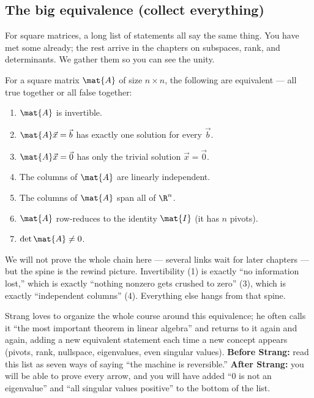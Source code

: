 \subsection{The big equivalence (collect everything)}

For square matrices, a long list of statements all say the same thing. You have met some
already; the rest arrive in the chapters on subspaces, rank, and determinants. We gather
them so you can see the unity.

\begin{theorem}
\label{ch08:imt}
For a square matrix $\mat{A}$ of size $n\times n$, the following are equivalent --- all
true together or all false together:
\begin{enumerate}
\item $\mat{A}$ is invertible.
\item $\mat{A}\vec{x} = \vec{b}$ has exactly one solution for every $\vec{b}$.
\item $\mat{A}\vec{x} = \vec{0}$ has only the trivial solution $\vec{x} = \vec{0}$.
\item The columns of $\mat{A}$ are linearly independent.
\item The columns of $\mat{A}$ span all of $\R^n$.
\item $\mat{A}$ row-reduces to the identity $\mat{I}$ (it has $n$ pivots).
\item $\det\mat{A} \ne 0$.
\end{enumerate}
\end{theorem}

We will not prove the whole chain here --- several links wait for later chapters --- but
the spine is the rewind picture. Invertibility (1) is exactly ``no information lost,''
which is exactly ``nothing nonzero gets crushed to zero'' (3), which is exactly
``independent columns'' (4). Everything else hangs from that spine.

\begin{strangbox}
Strang loves to organize the whole course around this equivalence; he often calls it
``the most important theorem in linear algebra'' and returns to it again and again,
adding a new equivalent statement each time a new concept appears (pivots, rank,
nullspace, eigenvalues, even singular values). \textbf{Before Strang:} read this list as
seven ways of saying ``the machine is reversible.'' \textbf{After Strang:} you will be
able to prove every arrow, and you will have added ``$0$ is not an eigenvalue'' and
``all singular values positive'' to the bottom of the list.
\end{strangbox}

